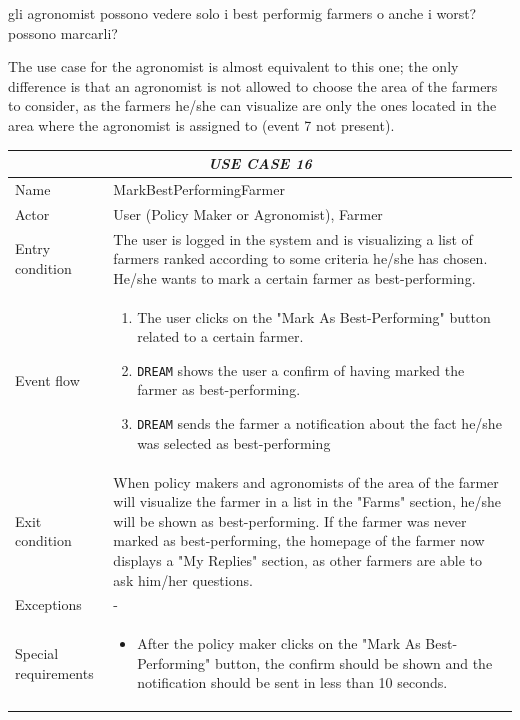 \documentclass{article}
\begin{document}
\color{red} gli agronomist possono vedere solo i best performig farmers o anche i worst? possono marcarli? \color{black}

The use case for the agronomist is almost equivalent to this one; the only difference is that an agronomist is not allowed to choose the area of the farmers to consider, as the farmers he/she can visualize are only the ones located in the area where the agronomist is assigned to (event 7 not present).


\centering
\begin{longtable}{|p{3.5cm}|m{8cm}|}
 \hline
 \multicolumn{2}{|c|}{\cellcolor{white}\emph{USE CASE 16}} \\
 \endfirsthead
 \endhead
 \endfoot
 \endlastfoot
 \hline
 Name & MarkBestPerformingFarmer\\
 \hline
 Actor & User (Policy Maker or Agronomist), Farmer\\
 \hline
 Entry condition & The user is logged in the system and is visualizing a list of farmers ranked according to some criteria he/she has chosen. He/she wants to mark a certain farmer as best-performing.\\
 \hline
 Event flow & \begin{enumerate}
    \item The user clicks on the "Mark As Best-Performing" button related to a certain farmer.
    \item \verb|DREAM| shows the user a confirm of having marked the farmer as best-performing.
    \item \verb|DREAM| sends the farmer a notification about the fact he/she was selected as best-performing
 \end{enumerate}\\
 \hline
 Exit condition &  When policy makers and agronomists of the area of the farmer will visualize the farmer in a list in the "Farms" section, he/she will be shown as best-performing.
 If the farmer was never marked as best-performing, the homepage of the farmer now displays a "My Replies" section, as other farmers are able to ask him/her questions.\\
 \hline
 Exceptions & -\\
 \hline
 Special requirements &\begin{itemize}
     \item After the policy maker clicks on the "Mark As Best-Performing" button, the confirm should be shown and the notification should be sent in less than 10 seconds.
 \end{itemize}\\
 \hline
\end{longtable}
\end{document}
